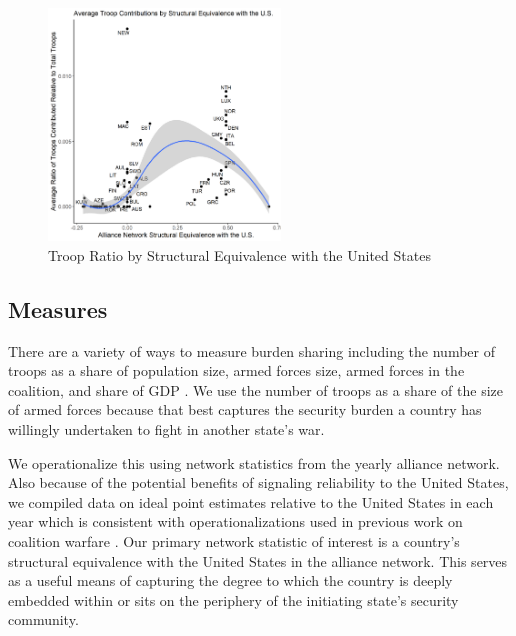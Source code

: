 \documentclass[12pt,letterpaper]{article}
\begin{document}
		\begin{figure}[H]
			\centering
			\includegraphics[width=0.55\textwidth]{figures/contributions.png}
			\caption{Troop Ratio by Structural Equivalence with the United States}
			\label{fig:contr_sequiv}
		\end{figure}

	\subsection{Measures}
		There are a variety of ways to measure burden sharing including the number of troops as a share of population size, armed forces size, armed forces in the coalition, and share of GDP \citep{hartley_natoburdensharingfuture_1999}. We use the number of troops as a share of the size of armed forces because that best captures the security burden a country has willingly undertaken to fight in another state's war.
		
	
		We operationalize this using network statistics from the yearly alliance network. Also because of the potential benefits of signaling reliability to the United States, we compiled data on ideal point estimates relative to the United States in each year which is consistent with operationalizations used in previous work on coalition warfare \citep{wolford_politicsmilitarycoalitions_2015}. Our primary network statistic of interest is a country's structural equivalence with the United States in the alliance network. This serves as a useful means of capturing the degree to which the country is deeply embedded within or sits on the periphery of the initiating state's security community.
\end{document}
